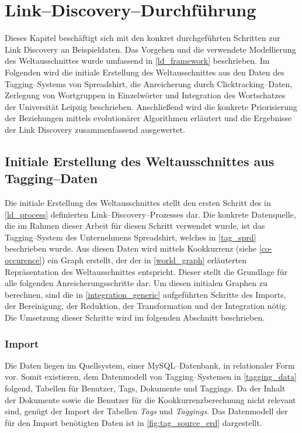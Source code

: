 \chapter{Link--Discovery--Durchführung}
\label{link_discovery}

Dieses Kapitel beschäftigt sich mit den konkret durchgeführten Schritten zur Link Discovery an Beispieldaten. Das Vorgehen und die verwendete Modellierung des Weltausschnittes wurde umfassend in \cref{ld_framework} beschrieben. Im Folgenden wird die initiale Erstellung des Weltausschnittes aus den Daten des Tagging--Systems von Spreadshirt, die Anreicherung durch Clicktracking--Daten, Zerlegung von Wortgruppen in Einzelwörter und Integration des Wortschatzes der Universität Leipzig beschrieben. Anschließend wird die konkrete Priorisierung der Beziehungen mittels evolutionärer Algorithmen erläutert und die Ergebnisse der Link Discovery zusammenfassend ausgewertet.

\section{Initiale Erstellung des Weltausschnittes aus Tagging--Daten}
\label{ld_tags}

Die initiale Erstellung des Weltausschnittes stellt den ersten Schritt des in \cref{ld_process} definierten Link--Discovery--Prozesses dar. Die konkrete Datenquelle, die im Rahmen dieser Arbeit für diesen Schritt verwendet wurde, ist das Tagging--System des Unternehmens Spreadshirt, welches in \cref{tag_sprd} beschrieben wurde. Aus diesen Daten wird mittels Kookkurrenz (siehe \cref{co-occurence}) ein Graph erstellt, der der in \cref{world_graph} erläuterten Repräsentation des Weltausschnittes entspricht. Dieser stellt die Grundlage für alle folgenden Anreicherungsschritte dar. Um diesen initialen Graphen zu berechnen, sind die in \cref{integration_generic} aufgeführten Schritte des Imports, der Bereinigung, der Reduktion, der Transformation und der Integration nötig. Die Umsetzung dieser Schritte wird im folgenden Abschnitt beschrieben.

\subsection{Import}

Die Daten liegen im Quellsystem, einer MySQL--Datenbank, in relationaler Form vor. Somit existieren, dem Datenmodell von Tagging--Systemen in \cref{tagging_data} folgend, Tabellen für Benutzer, Tags, Dokumente und Taggings. Da der Inhalt der Dokumente sowie die Benutzer für die Kookkurrenzberechnung nicht relevant sind, genügt der Import der Tabellen \emph{Tags} und \emph{Taggings}. Das Datenmodell der für den Import benötigten Daten ist in \cref{fig:tag_source_erd} dargestellt.

